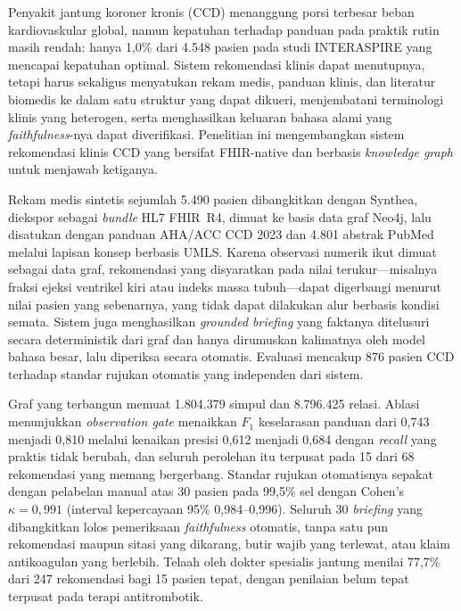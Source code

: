 \begin{singlespace}

\indent Penyakit jantung koroner kronis (CCD) menanggung porsi terbesar beban
kardiovaskular global, namun kepatuhan terhadap panduan pada praktik rutin masih rendah:
hanya 1,0\% dari 4.548 pasien pada studi INTERASPIRE yang mencapai kepatuhan optimal.
Sistem rekomendasi klinis dapat menutupnya, tetapi harus sekaligus menyatukan rekam
medis, panduan klinis, dan literatur biomedis ke dalam satu struktur yang dapat dikueri,
menjembatani terminologi klinis yang heterogen, serta menghasilkan keluaran bahasa alami
yang \emph{faithfulness}-nya dapat diverifikasi. Penelitian ini mengembangkan sistem
rekomendasi klinis CCD yang bersifat FHIR-native dan berbasis \emph{knowledge graph}
untuk menjawab ketiganya.

Rekam medis sintetis sejumlah 5.490 pasien dibangkitkan dengan Synthea, diekspor sebagai
\emph{bundle} HL7 FHIR~R4, dimuat ke basis data graf Neo4j, lalu disatukan dengan panduan
AHA/ACC CCD 2023 dan 4.801 abstrak PubMed melalui lapisan konsep berbasis UMLS. Karena
observasi numerik ikut dimuat sebagai data graf, rekomendasi yang disyaratkan pada nilai
terukur---misalnya fraksi ejeksi ventrikel kiri atau indeks massa tubuh---dapat digerbangi
menurut nilai pasien yang sebenarnya, yang tidak dapat dilakukan alur berbasis kondisi
semata. Sistem juga menghasilkan \emph{grounded briefing} yang faktanya ditelusuri secara
deterministik dari graf dan hanya dirumuskan kalimatnya oleh model bahasa besar, lalu
diperiksa secara otomatis. Evaluasi mencakup 876 pasien CCD terhadap standar rujukan
otomatis yang independen dari sistem.

Graf yang terbangun memuat 1.804.379 simpul dan 8.796.425 relasi. Ablasi menunjukkan
\emph{observation gate} menaikkan $F_1$ keselarasan panduan dari 0,743 menjadi 0,810 melalui
kenaikan presisi 0,612 menjadi 0,684 dengan \emph{recall} yang praktis tidak berubah, dan
seluruh perolehan itu terpusat pada 15 dari 68 rekomendasi yang memang bergerbang. Standar
rujukan otomatisnya sepakat dengan pelabelan manual atas 30 pasien pada 99,5\% sel dengan
Cohen's $\kappa = 0{,}991$ (interval kepercayaan 95\% 0,984--0,996). Seluruh 30 \emph{briefing} yang dibangkitkan lolos pemeriksaan
\emph{faithfulness} otomatis, tanpa satu pun rekomendasi maupun sitasi yang dikarang, butir
wajib yang terlewat, atau klaim antikoagulan yang berlebih. Telaah oleh dokter spesialis
jantung menilai 77,7\% dari 247 rekomendasi bagi 15 pasien tepat, dengan penilaian belum
tepat terpusat pada terapi antitrombotik.


\end{singlespace}
